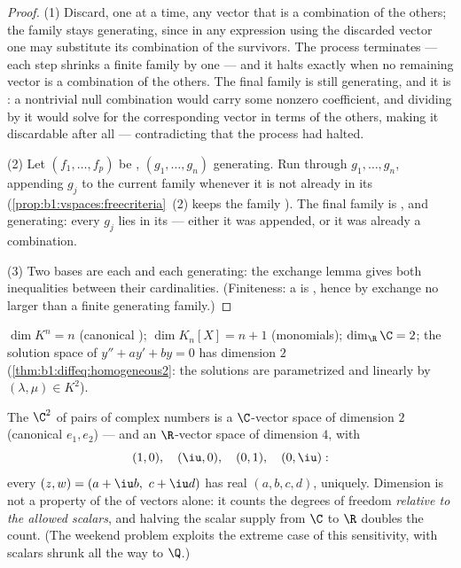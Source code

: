 \begin{proof}
(1) Discard, one at a time, any vector that is a combination of
the others; the family stays generating, since in any expression
using the discarded vector one may substitute its combination of
the survivors. The process terminates --- each step shrinks a
finite family by one --- and it halts exactly when no remaining
vector is a combination of the others. The final family is still
generating, and it is : a nontrivial null combination would
carry some nonzero coefficient, and dividing by it would solve
for the corresponding vector in terms of the others, making it
discardable after all --- contradicting that the process had
halted.

(2) Let $(f_1, \dots, f_p)$ be , $(g_1, \dots, g_n)$ generating.
Run through $g_1, \dots, g_n$, appending $g_j$ to the current family
whenever it is not already in its 
(\cref{prop:b1:vspaces:freecriteria}~(2) keeps the family ).
The final family is , and generating: every $g_j$ lies in its
 --- either it was appended, or it was already a combination.

(3) Two bases are each  and each generating: the exchange lemma
gives both inequalities between their cardinalities. (Finiteness:
a  is , hence by exchange no larger than a finite
generating family.)
\end{proof}

\begin{example}\label{ex:b1:findim:dims}
$\dim K^n = n$ (canonical ); $\dim K_n[X] = n + 1$ (monomials);
$\dim_\R \C = 2$; the solution space of $y'' + ay' + by = 0$ has
dimension $2$ (\cref{thm:b1:diffeq:homogeneous2}: the solutions are
parametrized  and linearly by $(\lambda, \mu) \in K^2$).
\end{example}

\begin{example}
\label{ex:b1:findim:twodimensions}
The  $\C^2$ of pairs of complex numbers is a $\C$-vector space
of dimension $2$ (canonical  $e_1, e_2$) --- and an
$\R$-vector space of dimension $4$, with 
\[
(1, 0),\quad (\iu, 0),\quad (0, 1),\quad (0, \iu):
\]
every $(z, w) = (a + \iu b,\ c + \iu d)$ has real 
$(a, b, c, d)$, uniquely. Dimension is not a property of the 
of vectors alone: it counts the degrees of freedom \emph{relative
to the allowed scalars}, and halving the scalar supply from $\C$
to $\R$ doubles the count. (The weekend problem exploits the
extreme case of this sensitivity, with scalars shrunk all the
way to $\Q$.)
\end{example}

